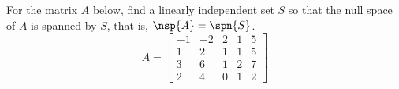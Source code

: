 For the matrix $A$ below, find a linearly independent set $S$ so that the null space of $A$ is spanned by $S$, that is, $\nsp{A}=\spn{S}$. 
%
\begin{equation*}
A=
\begin{bmatrix}
 -1 & -2 & 2 & 1 & 5 \\
 1 & 2 & 1 & 1 & 5 \\
 3 & 6 & 1 & 2 & 7 \\
 2 & 4 & 0 & 1 & 2
\end{bmatrix}
\end{equation*}